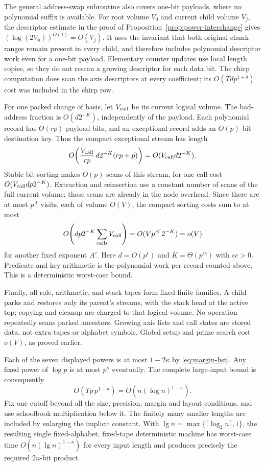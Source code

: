 \documentclass[11pt]{article}
\theoremstyle{definition}
\begin{document}
The general address-swap subroutine also covers one-bit payloads,
where no polynomial suffix is available. For root volume $V_0$ and
current child volume $V_j$, the descriptor estimate in the proof of
Proposition~\ref{prop:power-interchange} gives
$(\log(2V_0))^{O(1)}=O(V_j)$. It uses the invariant that both original
chunk ranges remain present in every child, and therefore includes
polynomial descriptor work even for a one-bit payload.
Elementary counter updates use local length copies, so they do not
rescan a growing descriptor for each data bit.  The chirp computation
does scan the axis descriptors at every coefficient; its
$O(Tdp^{1+\delta})$ cost was included in the chirp row.

For one packed change of basis, let $V_{\rm call}$ be its current
logical volume.  The bad-address fraction is
$O(d2^{-K})$, independently of the payload.  Each polynomial record
has $\Theta(rp)$ payload bits, and an exceptional record adds an
$O(p)$-bit destination key.  Thus the compact exceptional stream has
length
\[
 O\!\left(\frac{V_{\rm call}}{rp}\,d2^{-K}(rp+p)\right)
   =O(V_{\rm call}d2^{-K}).
\]
Stable bit sorting makes $O(p)$ scans of this stream, for one-call
cost $O(V_{\rm call}dp2^{-K})$.  Extraction and reinsertion use a
constant number of scans of the full current volume; those scans are
already in the node overhead.  Since there are at most $p^A$ visits,
each of volume $O(V)$, the compact sorting costs sum to at most
\[
 O\!\left(dp2^{-K}\sum_{\rm calls}V_{\rm call}\right)
   =O(Vp^{A'}2^{-K})=o(V)
\]
for another fixed exponent $A'$.  Here $d=O(p^\epsilon)$ and
$K=\Theta(p^{\epsilon c})$ with $\epsilon c>0$.  Predicate and key
arithmetic is the polynomial work per record counted above.  This is
a deterministic worst-case bound.

Finally, all role, arithmetic, and stack tapes form fixed finite
families.  A child parks and restores only its parent's streams, with
the stack head at the active top; copying and cleanup are charged to
that logical volume.  No operation repeatedly scans parked ancestors.
Growing axis lists and call states are stored data, not extra tapes or
alphabet symbols.  Global setup and prime search cost $o(V)$, as
proved earlier.

Each of the seven displayed powers is at most $1-2\kappa$ by
\eqref{eq:margin-list}.  Any fixed power of $\log p$ is at most $p^\kappa$
eventually.  The complete large-input bound is consequently
\[
 O(Tp\,p^{1-\kappa})=O(n(\log n)^{1-\kappa}).
\]
Fix one cutoff beyond all the size, precision, margin and layout
conditions, and use schoolbook multiplication below it.  The finitely
many smaller lengths are included by enlarging the implicit constant.
With $\lg n=\max\{\lceil\log_2n\rceil,1\}$, the resulting single
fixed-alphabet, fixed-tape deterministic machine has worst-case time
$O(n(\lg n)^{1-\kappa})$ for every input length and produces precisely
the required $2n$-bit product.
\end{document}
